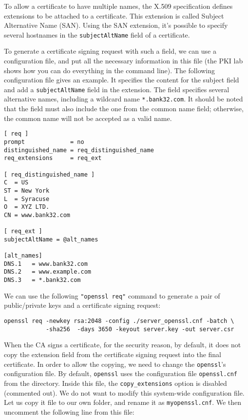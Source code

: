 To allow a certificate to have multiple names, 
the X.509 specification defines extensions to be attached to a certificate.
This extension is called Subject Alternative Name (SAN).
Using the SAN extension, it’s possible
to specify several hostnames in the \texttt{subjectAltName} field of a certificate.

To generate a certificate signing request with such a field, we can 
use a configuration file, and put all the necessary information in this file (the PKI
lab shows how you can do everything in the command line).  
The following configuration file gives an example. It specifies 
the content for the subject field and add a 
\texttt{subjectAltName} field in the extension. The field specifies 
several alternative names, including a wildcard name \texttt{*.bank32.com}.  
It should be noted that the field must also
include the one from the common name field;
otherwise, the common name will not be accepted as a valid name.


\begin{lstlisting}[caption={\texttt{server\_openssl.cnf}}]
[ req ]
prompt             = no
distinguished_name = req_distinguished_name
req_extensions     = req_ext

[ req_distinguished_name ]
C  = US
ST = New York
L  = Syracuse
O  = XYZ LTD.
CN = www.bank32.com

[ req_ext ]
subjectAltName = @alt_names

[alt_names]
DNS.1   = www.bank32.com
DNS.2   = www.example.com
DNS.3   = *.bank32.com
\end{lstlisting}

We can use the following \texttt{"openssl req"} command to generate 
a pair of public/private keys and a certificate signing request:

\begin{lstlisting}
openssl req -newkey rsa:2048 -config ./server_openssl.cnf -batch \
            -sha256  -days 3650 -keyout server.key -out server.csr 
\end{lstlisting}


When the CA signs a certificate, for the security reason, by default, it does not 
copy the extension field from the certificate signing request into
the final certificate. In order to allow the copying, we 
need to change the \texttt{openssl}'s configuration file.  
By default, \texttt{openssl} uses the configuration
file \texttt{openssl.cnf} from the  directory. 
Inside this file, the \texttt{copy\_extensions}
option is disabled (commented out). We do not want to modify
this system-wide configuration file. Let us
copy it file to our own folder, and rename it as \texttt{myopenssl.cnf}.
We then uncomment the following line from this file: 

